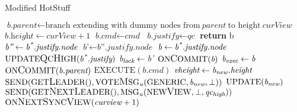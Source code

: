 \begin{algorithm}[h!]
	\caption{Modified HotStuff}\label{hotstuff}
	\begin{algorithmic}[1]
	\color{Magenta}
		\State $\textit{b.parent} \gets \text{branch extending with dummy nodes from}\ \textit{parent}\ \text{to height}\ \textit{curView}$
		\State $\textit{b.height} \gets \textit{curView} + 1$
		\State $\textit{b.cmd} \gets \textit{cmd}$
		\State $\textit{b.justify} \gets \textit{qc}$
		\State \textbf{return} b
	\EndFunction
	\color{black}
		\State $\textit{b''} \gets \textit{b\textsuperscript{*}.justify.node}$
		\State $\textit{b'} \gets \textit{b''.justify.node}$
		\State $\textit{b} \gets \textit{b\textsuperscript{*}.justify.node}$
		\State $\text{UPDATE{\large Q}C{\large H}IGH}(\textit{b\textsuperscript{*}.justify})$
			\State $\textit{b\textsubscript{lock}} \gets \textit{b'}$
		\EndIf
			\State $\text{ON{\large C}OMMIT}(\textit{b})$
			\State $\textit{b\textsubscript{exec}} \gets \textit{b}$
		\EndIf
	\EndProcedure
			\State $\text{ON{\large C}OMMIT}(\textit{b.parent})$
			\State $\text{EXECUTE}(\textit{b.cmd})$
		\EndIf
	\EndProcedure
		\color{Green}
			\color{black}
				\State $\textit{vheight} \gets \textit{b\textsubscript{new}.height}$
				\State $ \text{SEND}(\text{GET{\large L}EADER}(), \text{VOTE{\large M}SG}\textsubscript{\textit{u}}(\text{GENERIC}, \textit{b\textsubscript{new}}, \bot))$
			\EndIf
			\State $\text{UPDATE}(\textit{b\textsubscript{new}})$
			\color{Green}
			\State $\text{SEND}(\text{GET{\large N}EXT{\large L}EADER}(), \text{MSG}\textsubscript{\textit{u}}(\text{NEW{\large V}IEW}, \bot, \textit{qc\textsubscript{high}}))$
				\State $\text{ON{\large N}EXT{\large S}YNC{\large V}IEW}(\textit{curview} + 1)$
			\EndIf
		\EndIf
		\color{black}

\end{algorithmic}
\end{algorithm}
